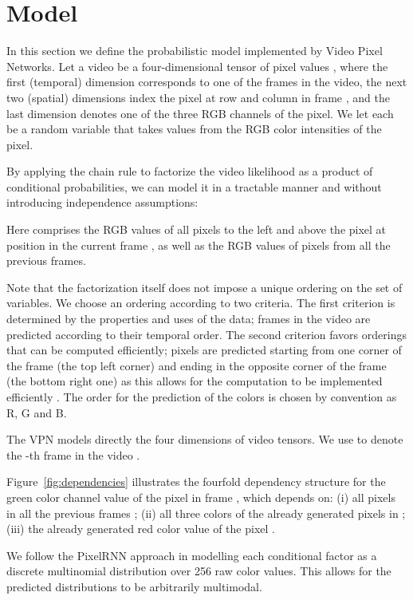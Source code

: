 \documentclass{article}
\begin{document}
\section{Model}
\label{sec:factor}
In this section we define the probabilistic model implemented by Video Pixel Networks.
Let a video  be a four-dimensional tensor of pixel values , where the first (temporal) dimension  corresponds to one of the frames in the video, the next two (spatial) dimensions  index the pixel at row  and column  in frame , and the last dimension  denotes one of the three RGB channels of the pixel. 
We let each  be a random variable that takes values from the RGB color intensities of the pixel. 

By applying the chain rule to factorize the video likelihood  as a product of conditional probabilities, we can model it in a tractable manner and without introducing independence assumptions:


Here  comprises the RGB values of all pixels to the left and above the pixel at position  in the current frame , as well as the RGB values of pixels from all the previous frames. 
  
Note that the factorization itself does not impose a unique ordering on the set of variables. We choose an ordering according to two criteria. The first criterion is determined by the properties and uses of the data; frames in the video are predicted according to their temporal order. The second criterion favors orderings that can be computed efficiently; pixels are predicted starting from one corner of the frame  (the top left corner)  and ending in the opposite corner of the frame (the bottom right one) as this allows for the computation to be implemented efficiently \citep{van2016pixel}. The order for the prediction of the colors is chosen by convention as R, G and B.


The VPN models directly the four dimensions of video tensors.  We use  to denote the -th frame  in the video .

Figure~\ref{fig:dependencies} illustrates the fourfold dependency structure for the green color channel value of the pixel  in frame ,
which depends on:
(i) all pixels in all the previous frames ;
(ii) all three colors of the already generated pixels in ;
(iii) the already generated red color value of the pixel .

We follow the PixelRNN approach \citep{van2016pixel} in modelling each conditional factor as a discrete multinomial distribution over 256 raw color values. 
This allows for the predicted distributions to be arbitrarily multimodal.
\end{document}

